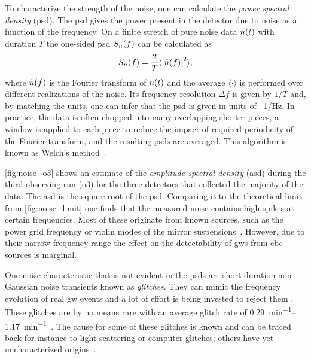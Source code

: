 To characterize the strength of the noise, one can calculate the \emph{power spectral density} (\acrshort{psd}). The \acrshort{psd} gives the power present in the detector due to noise as a function of the frequency. On a finite stretch of pure noise data $n{\left( t \right)}$ with duration $T$ the one-sided \acrshort{psd} $S_n{\left( f \right)}$ can be calculated as~\cite{Maggiore:2008aaa}%
\begin{equation}
S_n{\left( f \right)} = \frac{2}{T} \langle{\left|\tilde{n}{\left( f \right)}\right|}^2\rangle,
\end{equation}
where $\tilde{n}{\left( f \right)}$ is the Fourier transform of $n{\left( t \right)}$ and the average $\langle\cdot\rangle$ is performed over different realizations of the noise. Its frequency resolution $\Delta f$ is given by $1/T$ and, by matching the units, one can infer that the \acrshort{psd} is given in units of \SI{}{1/\hertz}. In practice, the data is often chopped into many overlapping shorter pieces, a window is applied to each piece to reduce the impact of required periodicity of the Fourier transform, and the resulting \acrshort{psd}s are averaged. This algorithm is known as Welch's method~\cite{Welch:1967aaa}.

\autoref{fig:noise_o3} shows an estimate of the \emph{amplitude spectral density} (\acrshort{asd}) during the third observing run (\acrshort{o3}) for the three detectors that collected the majority of the data. The \acrshort{asd} is the square root of the \acrshort{psd}. Comparing it to the theoretical limit from \autoref{fig:noise_limit} one finds that the measured noise contains high spikes at certain frequencies. Most of these originate from known sources, such as the power grid frequency or violin modes of the mirror suspensions~\cite{LIGOScientific:2019hgc}. However, due to their narrow frequency range the effect on the detectability of \acrshort{gw}s from \acrshort{cbc} sources is marginal.

One noise characteristic that is not evident in the \acrshort{psd}s are short duration non-Gaussian noise transients known as \emph{glitches}. They can mimic the frequency evolution of real \acrshort{gw} events and a lot of effort is being invested to reject them \cite{Allen:1999yt, Allen:2004gu, Zevin:2016qwy, Robinet:2020lbf}. These glitches are by no means rare with an average glitch rate of \SIrange{0.29}{1.17}{\minute^{-1}}~\cite{LIGOScientific:2021djp}. The cause for some of these glitches is known and can be traced back for instance to light scattering or computer glitches; others have yet uncharacterized origins~\cite{Zevin:2016qwy}.

